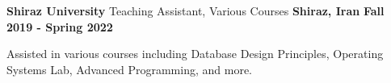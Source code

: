 \begin{cventries}
{    \cventry
    {\textbf{Shiraz University}} %
    {Teaching Assistant, Various Courses} %
    {\textbf{Shiraz, Iran}} %
    {\textbf{Fall 2019 - Spring 2022}} %
    {
      \begin{cvitems}
        \item Assisted in various courses including Database Design Principles, Operating Systems Lab, Advanced Programming, and more.
      \end{cvitems}
    }
}
\end{cventries}
